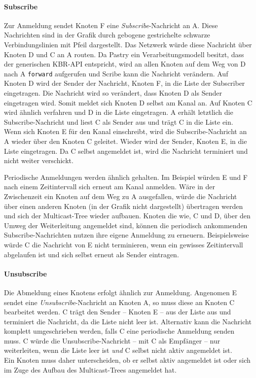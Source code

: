 \paragraph{Subscribe}
Zur Anmeldung sendet Knoten F eine \emph{Subscribe}-Nachricht an A. Diese Nachrichten sind in der Grafik durch gebogene gestrichelte schwarze Verbindungslinien mit Pfeil dargestellt. Das Netzwerk würde diese Nachricht über Knoten D und C an A routen. Da Pastry ein Verarbeitungsmodell besitzt, dass der generischen KBR-API entspricht, wird an allen Knoten auf dem Weg von D nach A \texttt{forward} aufgerufen und Scribe kann die Nachricht verändern. Auf Knoten D wird der Sender der Nachricht, Knoten F, in die Liste der Subscriber eingetragen. Die Nachricht wird so verändert, dass Knoten D als Sender eingetragen wird. Somit meldet sich Knoten D selbst am Kanal an. Auf Knoten C wird ähnlich verfahren und D in die Liste eingetragen. A erhält letztlich die Subscribe-Nachricht und liest C als Sender aus und trägt C in die Liste ein.\\
Wenn sich Knoten E für den Kanal einschreibt, wird die Subscribe-Nachricht an A wieder über den Knoten C geleitet. Wieder wird der Sender, Knoten E, in die Liste eingetragen. Da C selbst angemeldet ist, wird die Nachricht terminiert und nicht weiter verschickt.

Periodische Anmeldungen werden ähnlich gehalten. Im Beispiel würden E und F nach einem Zeitintervall sich erneut am Kanal anmelden. Wäre in der Zwischenzeit ein Knoten auf dem Weg zu A ausgefallen, würde die Nachricht über einen anderen Knoten (in der Grafik nicht dargestellt) übertragen werden und sich der Multicast-Tree wieder aufbauen. Knoten die wie, C und D, über den Umweg der Weiterleitung angemeldet sind, können die periodisch ankommenden Subscribe-Nachrichten nutzen ihre eigene Anmeldung zu erneuern. Beispielsweise würde C die Nachricht von E nicht terminieren, wenn ein gewisses Zeitintervall abgelaufen ist und sich selbst erneut als Sender eintragen.

\paragraph{Unsubscribe}
Die Abmeldung eines Knotens erfolgt ähnlich zur Anmeldung. Angenomen E sendet eine \emph{Unsubscribe}-Nachricht an Knoten A, so muss diese an Knoten C bearbeitet werden. C trägt den Sender -- Knoten E -- aus der Liste aus und terminiert die Nachricht, da die Liste nicht leer ist. Alternativ kann die Nachricht komplett umgeschrieben werden, falls C eine periodische Anmeldung senden muss. C würde die Unsubscribe-Nachricht -- mit C als Empfänger -- nur weiterleiten, wenn die Liste leer ist \emph{und} C selbst nicht aktiv angemeldet ist.\\
Ein Knoten muss daher unterscheiden, ob er selbst aktiv angemeldet ist oder sich im Zuge des Aufbau des Multicast-Trees angemeldet hat.

